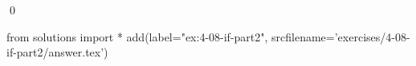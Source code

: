 
\begin{ex}
  \label{ex:4-08-if-part2}
  
  \qed
\end{ex}
\begin{python0}
from solutions import *
add(label="ex:4-08-if-part2",
    srcfilename='exercises/4-08-if-part2/answer.tex')
\end{python0}

